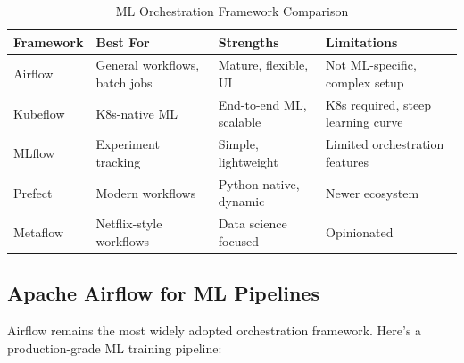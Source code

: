 \begin{table}[h]
\centering
\caption{ML Orchestration Framework Comparison}
\label{tab:orchestration_comparison}
\small
\begin{tabular}{@{}lp{3cm}p{3cm}p{3cm}@{}}
\toprule
\textbf{Framework} & \textbf{Best For} & \textbf{Strengths} & \textbf{Limitations} \\
\midrule
Airflow & General workflows, batch jobs & Mature, flexible, UI & Not ML-specific, complex setup \\
Kubeflow & K8s-native ML & End-to-end ML, scalable & K8s required, steep learning curve \\
MLflow & Experiment tracking & Simple, lightweight & Limited orchestration features \\
Prefect & Modern workflows & Python-native, dynamic & Newer ecosystem \\
Metaflow & Netflix-style workflows & Data science focused & Opinionated \\
\bottomrule
\end{tabular}
\end{table}

\subsection{Apache Airflow for ML Pipelines}

Airflow remains the most widely adopted orchestration framework. Here's a production-grade ML training pipeline:


